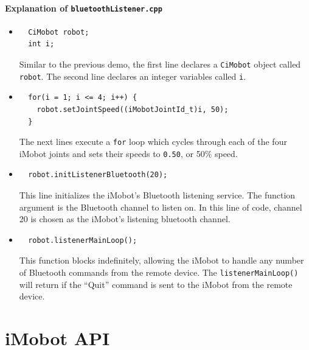 \documentclass[11pt]{report}
\begin{document}
\subsubsection{Explanation of \texttt{bluetoothListener.cpp}}
\begin{itemize}
\item 
\begin{verbatim}
  CiMobot robot;
  int i;
\end{verbatim}
Similar to the previous demo, the first line declares a \texttt{CiMobot} object
called \texttt{robot}. The second line declares an integer variables called 
\texttt{i}.
\item
\begin{verbatim}
  for(i = 1; i <= 4; i++) {
    robot.setJointSpeed((iMobotJointId_t)i, 50);
  }
\end{verbatim}
The next lines execute a \texttt{for} loop which cycles through each of the four
iMobot joints and sets their speeds to \texttt{0.50}, or 50\% speed.
\item
\begin{verbatim}
  robot.initListenerBluetooth(20);
\end{verbatim}
This line initializes the iMobot's Bluetooth listening service. The function argument
is the Bluetooth channel to listen on. In this line of code, channel 20 is chosen
as the iMobot's listening bluetooth channel. 
\item
\begin{verbatim}
  robot.listenerMainLoop();
\end{verbatim}
This function blocks indefinitely, allowing the iMobot to handle any number of Bluetooth
commands from the remote device. The \texttt{listenerMainLoop()} will return if the
``Quit'' command is sent to the iMobot from the remote device.
\end{itemize}

\appendix
\chapter{iMobot API}

\pagebreak

{}
\printindex
\end{document}
